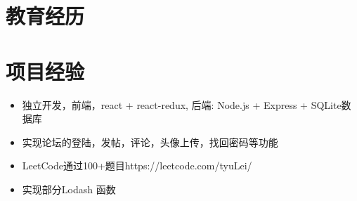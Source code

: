 \documentclass{resume}
\begin{document}


 

\section{教育经历}





\section{项目经验}
\begin{itemize}
  \item 独立开发，前端，react + react-redux, 后端: Node.js + Express + SQLite数据库
  \item 实现论坛的登陆，发帖，评论，头像上传，找回密码等功能
  \item LeetCode通过100+题目https://leetcode.com/tyuLei/
  \item 实现部分Lodash 函数
\end{itemize}
\end{document}
